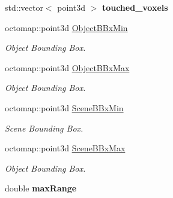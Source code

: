 \begin{DoxyCompactItemize}
\item 
std\+::vector$<$ point3d $>$ {\bfseries touched\+\_\+voxels}\hypertarget{classPMVolumetric_a930aea947f9855b6a11beea7766a4ed6}{}\label{classPMVolumetric_a930aea947f9855b6a11beea7766a4ed6}

\item 
octomap\+::point3d \hyperlink{classPMVolumetric_ab7340711e6ce41fc6b8e6f78ae7d69c4}{Object\+B\+Bx\+Min}\hypertarget{classPMVolumetric_ab7340711e6ce41fc6b8e6f78ae7d69c4}{}\label{classPMVolumetric_ab7340711e6ce41fc6b8e6f78ae7d69c4}

\begin{DoxyCompactList}\small\item\em Object Bounding Box. \end{DoxyCompactList}\item 
octomap\+::point3d \hyperlink{classPMVolumetric_aac9569cd27f3327d16712ed0f1b88c93}{Object\+B\+Bx\+Max}\hypertarget{classPMVolumetric_aac9569cd27f3327d16712ed0f1b88c93}{}\label{classPMVolumetric_aac9569cd27f3327d16712ed0f1b88c93}

\begin{DoxyCompactList}\small\item\em Object Bounding Box. \end{DoxyCompactList}\item 
octomap\+::point3d \hyperlink{classPMVolumetric_a64090a48fe74f0280993d207806ab368}{Scene\+B\+Bx\+Min}\hypertarget{classPMVolumetric_a64090a48fe74f0280993d207806ab368}{}\label{classPMVolumetric_a64090a48fe74f0280993d207806ab368}

\begin{DoxyCompactList}\small\item\em Scene Bounding Box. \end{DoxyCompactList}\item 
octomap\+::point3d \hyperlink{classPMVolumetric_ac33a421b9bc0138bf3f498b2693815fb}{Scene\+B\+Bx\+Max}\hypertarget{classPMVolumetric_ac33a421b9bc0138bf3f498b2693815fb}{}\label{classPMVolumetric_ac33a421b9bc0138bf3f498b2693815fb}

\begin{DoxyCompactList}\small\item\em Object Bounding Box. \end{DoxyCompactList}\item 
double {\bfseries max\+Range}\hypertarget{classPMVolumetric_a052a168a384cfbecbf6a5715f2154b34}{}\label{classPMVolumetric_a052a168a384cfbecbf6a5715f2154b34}


\end{DoxyCompactItemize}
